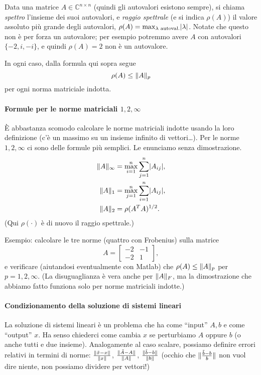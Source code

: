 \documentclass[a4paper]{report}
\DeclarePairedDelimiter{\abs}{\lvert}{\rvert}
\DeclarePairedDelimiter{\norm}{\lVert}{\rVert}
\theoremstyle{definiton}
\theoremstyle{remark}
\begin{document}
Data una matrice $A \in \mathbb{C}^{n\times n}$ (quindi gli autovalori esistono sempre), si chiama \emph{spettro} l'insieme dei suoi autovalori, e \emph{raggio spettrale} (e si indica $\rho(A)$) il valore assoluto più grande degli autovalori, $\rho(A) = \max_{\lambda \text{ autoval.}} \abs{\lambda}$. Notate che questo non è per forza un autovalore; per esempio potremmo avere $A$ con autovalori $\{-2, i, -i\}$, e quindi $\rho(A)=2$ non è un autovalore.

In ogni caso, dalla formula qui sopra segue
\[
\rho(A) \leq \norm{A}_p
\]
per ogni norma matriciale indotta.

\paragraph{Formule per le norme matriciali $1,2,\infty$}
È abbastanza scomodo calcolare le norme matriciali indotte usando la loro definizione (c'è un massimo su un insieme infinito di vettori\dots). Per le norme $1,2,\infty$ ci sono delle formule più semplici. Le enunciamo senza dimostrazione.
\begin{align*}
\norm{A}_{\infty} &= \max_{i=1}^n \sum_{j=1}^n \abs{A_{ij}},\\
\norm{A}_{1} &= \max_{j=1}^n \sum_{i=1}^n \abs{A_{ij}},\\
\norm{A}_2 &= \rho(A^TA)^{1/2}.
\end{align*}
(Qui $\rho(\cdot)$ è di nuovo il raggio spettrale.)

Esempio: calcolare le tre norme (quattro con Frobenius) sulla matrice
\[
A = \begin{bmatrix}
    -2 & -1\\
    -2 & 1
\end{bmatrix},
\]
e verificare (aiutandosi eventualmente con Matlab) che $\rho(A)\leq \norm{A}_p$ per $p=1,2,\infty$. (La disuguaglianza è vera anche per $\norm{A}_F$, ma la dimostrazione che abbiamo fatto funziona solo per norme matriciali indotte.)

\paragraph{Condizionamento della soluzione di sistemi lineari} La soluzione di sistemi lineari è un problema che ha come ``input'' $A,b$ e come ``output'' $x$. Ha senso chiederci come cambia $x$ se perturbiamo $A$ oppure $b$ (o anche tutti e due insieme). Analogamente al caso scalare, possiamo definire errori relativi in termini di norme: $\frac{\norm{\tilde{x}-x}}{\norm{x}}$, $\frac{\norm{\tilde{A}-A}}{\norm{A}}$, $\frac{\norm{\tilde{b}-b}}{\norm{b}}$ (occhio che $\norm{\frac{\tilde{b}-b}{b}}$ non vuol dire niente, non possiamo dividere per vettori!)
\end{document}
